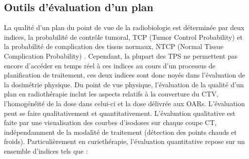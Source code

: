 \subsection{Outils d'évaluation d'un plan}
La qualité d’un plan du point de vue de la radiobiologie est déterminée par deux indices, la probabilité de contrôle tumoral, TCP (Tumor Control Probability)  \cite{Okunieff} et la probabilité de complication des tissus normaux, NTCP (Normal Tissue Complication Probability)  \cite{Lyman, Niemierko, Emami}. Cependant, la plupart des TPS ne permettent pas encore d’accéder en temps réel à ces indices au cours d’un processus de planification de traitement,  ces deux indices sont donc noyés dans l’évaluation de la dosimétrie physique. Du point de vue physique, l’évaluation de la qualité d’un plan en radiothérapie inclut les aspects relatifs à la couverture du CTV, l’homogénéité de la dose dans celui-ci et la dose délivrée aux OARs. L’évaluation peut se faire qualitativement et quantitativement. L’évaluation qualitative est faite par une visualisation des courbes d'isodoses sur chaque coupe CT, indépendamment de la modalité de traitement (détection des points chauds et froids). Particulièrement en curiethérapie, l’évaluation quantitative repose sur un ensemble d’indices tels que \cite{Kehwar, Prabhakar, Anbumani, Saw}:\newline
%
